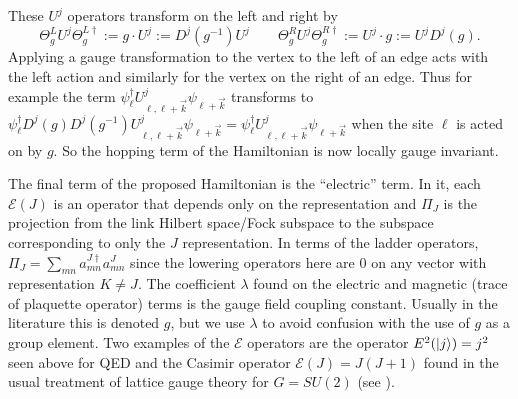\documentclass[11pt,reqno]{amsart}
\numberwithin{equation}{section}
\begin{document}
	These $U^j$ operators transform on the left and right by 
	\begin{equation}
		\Theta_{g}^L U^j \Theta_g^{L\dagger} :=g\cdot U^j := D^j(g^{-1})U^j \qquad \Theta_{g}^R U^j \Theta_g^{R\dagger} := U^j \cdot g := U^j D^j(g).
	\end{equation}
	Applying a gauge transformation to the vertex to the left of an edge acts with the left action and similarly for the vertex on the right of an edge.
	Thus for example the term $\psi_\ell^\dagger U_{\ell,\ell+\vec{k}}^j\psi_{\ell+\vec{k}}$ transforms to $\psi_\ell^\dagger D^j(g) D^j(g^{-1})U_{\ell,\ell+\vec{k}}^j\psi_{\ell+\vec{k}} = \psi_\ell^\dagger U_{\ell,\ell+\vec{k}}^j\psi_{\ell+\vec{k}}$ when the site $\ell$ is acted on by $g$.
	So the hopping term of the Hamiltonian is now locally gauge invariant. \\
	
	
	
	The final term of the proposed Hamiltonian is the ``electric'' term. 
	In it, each $\mathcal{E}(J)$ is an operator that depends only on the representation and $\Pi_J$ is the projection from the link Hilbert space/Fock subspace to the subspace corresponding to only the $J$ representation. 
	In terms of the ladder operators, $\Pi_J=\sum_{mn} a^{J\dagger}_{mn}a^J_{mn}$ since the lowering operators here are 0 on any vector with representation $K\neq J$.
	The coefficient $\lambda$ found on the electric and magnetic (trace of plaquette operator) terms is the gauge field coupling constant. 
	Usually in the literature this is denoted $g$, but we use $\lambda$ to avoid confusion with the use of $g$ as a group element.
	Two examples of the $\mathcal{E}$ operators are the operator $E^2(\ket{j})=j^2$ seen above for QED and the Casimir operator $\mathcal{E}(J)=J(J+1)$ found in the usual treatment of lattice gauge theory for $G=SU(2)$ (see \cite{KogutSusskind75}).
	
\end{document}
